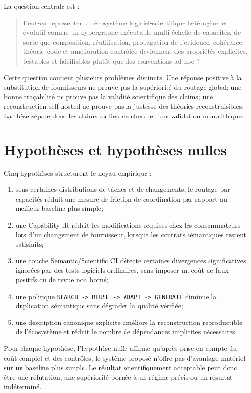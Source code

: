 La question centrale est :

\begin{quote}
Peut-on représenter un écosystème logiciel-scientifique hétérogène et évolutif comme un hypergraphe exécutable multi-échelle de capacités, de sorte que composition, réutilisation, propagation de l'evidence, cohérence théorie--code et amélioration contrôlée deviennent des propriétés explicites, testables et falsifiables plutôt que des conventions ad hoc ?
\end{quote}

Cette question contient plusieurs problèmes distincts. Une réponse positive à la substitution de fournisseurs ne prouve pas la supériorité du routage global; une bonne traçabilité ne prouve pas la validité scientifique des claims; une reconstruction self-hosted ne prouve pas la justesse des théories reconstruisibles. La thèse sépare donc les claims au lieu de chercher une validation monolithique.

\section{Hypothèses et hypothèses nulles}

Cinq hypothèses structurent le noyau empirique :

\begin{enumerate}[label=H\arabic*.]
  \item sous certaines distributions de tâches et de changements, le routage par capacités réduit une mesure de friction de coordination par rapport au meilleur baseline plus simple;
  \item une Capability IR réduit les modifications requises chez les consommateurs lors d'un changement de fournisseur, lorsque les contrats sémantiques restent satisfaits;
  \item une couche Semantic/Scientific CI détecte certaines divergences significatives ignorées par des tests logiciels ordinaires, sans imposer un coût de faux positifs ou de revue non borné;
  \item une politique \texttt{SEARCH -> REUSE -> ADAPT -> GENERATE} diminue la duplication sémantique sans dégrader la qualité vérifiée;
  \item une description canonique explicite améliore la reconstruction reproductible de l'écosystème et réduit le nombre de dépendances implicites nécessaires.
\end{enumerate}

Pour chaque hypothèse, l'hypothèse nulle affirme qu'après prise en compte du coût complet et des contrôles, le système proposé n'offre pas d'avantage matériel sur un baseline plus simple. Le résultat scientifiquement acceptable peut donc être une réfutation, une supériorité bornée à un régime précis ou un résultat indéterminé.

